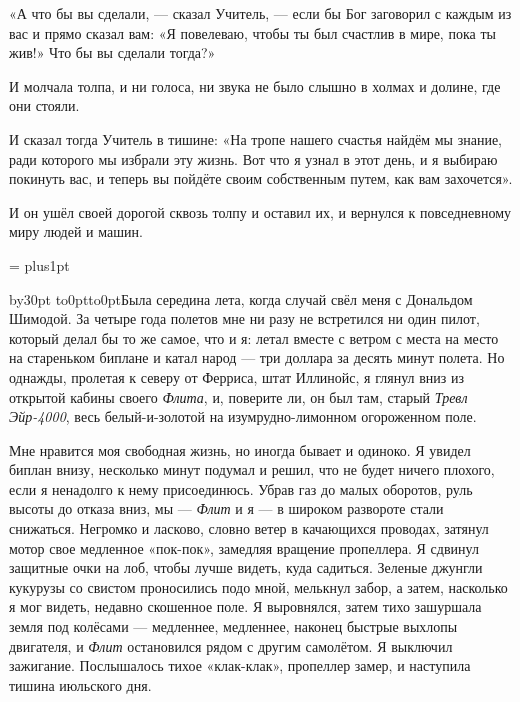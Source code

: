 «А что бы вы сделали, --- сказал Учитель, --- если бы Бог заговорил с каждым из вас и прямо сказал вам: «Я повелеваю, чтобы ты был счастлив в мире, пока ты жив!» Что бы вы сделали тогда?»

И молчала толпа, и ни голоса, ни звука не было слышно в холмах и долине, где они стояли.

И сказал тогда Учитель в тишине: «На тропе нашего счастья найдём мы знание, ради которого мы
избрали эту жизнь. Вот что я узнал в этот день, и я выбираю покинуть вас, и теперь вы пойдёте
своим собственным путем, как вам захочется».

И он ушёл своей дорогой сквозь толпу и оставил их, и вернулся к повседневному миру людей и машин.

\everypar={}
\rightskip=0pt \spaceskip=0pt \xspaceskip=0pt
\normalbaselines
\parskip=0pt plus1pt
\rm
\vfil\eject

{}
\vskip3cm

\begingroup{}
\def\par{\endgraf\endgroup}
\advance\parindent by30pt \hang{}
\noindent\vtop to0pt{\kern-8pt\hbox to0pt{\hss\kern\parindent\bukvfont Б\kern3pt}\vss}ыла середина
лета, когда случай свёл меня с Дональдом Шимодой.
За четыре года полетов мне ни разу не встретился ни один пилот, который делал бы то же самое, что
и я: летал вместе с ветром с места на место на стареньком биплане и катал народ --- три доллара
за десять минут полета. Но однажды, пролетая к северу от Ферриса, штат Иллинойс, я глянул вниз из
открытой кабины своего {\it Флита}, и, поверите ли, он был там, старый {\it Тревл Эйр-4000}, весь
белый-и-золотой на изумрудно-лимонном огороженном поле.

Мне нравится моя свободная жизнь, но иногда бывает и одиноко. Я увидел биплан внизу, несколько
минут подумал и решил, что не будет ничего плохого, если я ненадолго к нему присоединюсь. Убрав
газ до малых оборотов, руль высоты до отказа вниз, мы --- {\it Флит\/} и я --- в широком развороте стали
снижаться. Негромко и ласково, словно ветер в качающихся проводах, затянул мотор свое медленное
«пок-пок», замедляя вращение пропеллера. Я сдвинул защитные очки на лоб, чтобы лучше видеть, куда
садиться. Зеленые джунгли кукурузы со свистом проносились подо мной, мелькнул забор, а затем,
насколько я мог видеть, недавно скошенное поле. Я выровнялся, затем тихо зашуршала земля под
колёсами --- медленнее, медленнее, наконец быстрые выхлопы двигателя, и {\it Флит\/} остановился
рядом с другим самолётом. Я выключил зажигание. Послышалось тихое «клак-клак», пропеллер замер, и наступила тишина июльского дня.

